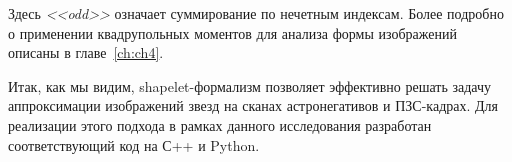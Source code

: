 Здесь \textit{<<odd>>} означает суммирование по нечетным индексам.
Более подробно о применении квадрупольных моментов для анализа формы изображений описаны в главе~\ref{ch:ch4}.

Итак, как мы видим, shapelet-формализм позволяет эффективно решать задачу аппроксимации изображений звезд на сканах астронегативов и ПЗС-кадрах. Для реализации этого подхода в рамках данного исследования разработан соответствующий код на С++ и Python.

